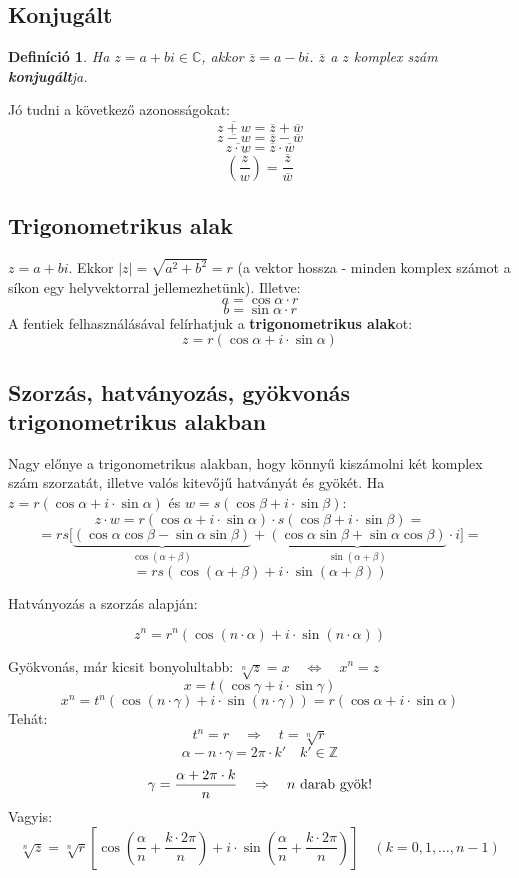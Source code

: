 \documentclass[a4paper,12pt,twoside]{book}
\newtheorem{defi}{Definíció}[chapter]
\theoremstyle{break}
\begin{document}
\subsection{Konjugált}

\begin{defi}
 Ha $z = a+bi \in\mathbb{C}$, akkor $\overline{z} = a-bi$. $\overline{z}$ a $z$ komplex szám \textbf{konjugált}ja.
\end{defi}

Jó tudni a következő azonosságokat:
\[\overline{z+w} = \overline{z}+\overline{w}\]
\[\overline{z-w} = \overline{z}-\overline{w}\]
\[\overline{z\cdot w} = \overline{z} \cdot \overline{w}\]
\[\overline{\left(\frac{z}{w}\right)} = \frac{\overline{z}}{\overline{w}}\]

\subsection{Trigonometrikus alak}

$z = a+bi$. Ekkor $|z| = \sqrt{a^2+b^2} = r$ (a vektor hossza - minden komplex számot a síkon egy helyvektorral jellemezhetünk). Illetve:
\[a = \cos\alpha\cdot r\]
\[b = \sin\alpha\cdot r\]
A fentiek felhasználásával felírhatjuk a \textbf{trigonometrikus alak}ot:
\[\boxed{z = r(\cos \alpha + i\cdot \sin\alpha)}\]

\subsection{Szorzás, hatványozás, gyökvonás trigonometrikus alakban}

Nagy előnye a trigonometrikus alakban, hogy könnyű kiszámolni két komplex szám szorzatát, illetve valós kitevőjű hatványát és gyökét. Ha $z=r(\cos \alpha + i\cdot \sin\alpha)$ és $w=s(\cos \beta + i\cdot \sin\beta)$:
\[z\cdot w = r(\cos \alpha + i\cdot \sin\alpha)\cdot s(\cos \beta + i\cdot \sin\beta) = \]
\[ = rs\Big[\underbrace{(\cos\alpha\cos\beta-\sin\alpha\sin\beta)}_{\cos(\alpha+\beta)}+\underbrace{(\cos\alpha\sin\beta+\sin\alpha\cos\beta)}_{\sin(\alpha+\beta)}\cdot i\Big] = \]
\[ = \boxed{rs(\cos(\alpha+\beta)+i\cdot \sin(\alpha+\beta))}\]

Hatványozás a szorzás alapján:

\[\boxed{z^n = r^n(\cos (n\cdot\alpha)+i\cdot \sin (n\cdot\alpha))}\]

Gyökvonás, már kicsit bonyolultabb: $\sqrt[n]{z} = x \quad \Leftrightarrow \quad x^n = z$
\[x = t(\cos\gamma+i\cdot\sin\gamma)\]
\[x^n = t^n(\cos (n\cdot\gamma)+i\cdot\sin(n\cdot \gamma)) = r(\cos \alpha+i\cdot \sin\alpha)\]
Tehát:
\[t^n = r \quad \Rightarrow \quad t = \sqrt[n]{r}\]
\[\alpha - n\cdot \gamma = 2\pi\cdot k' \quad k' \in \mathbb{Z}\]
\[\gamma = \frac{\alpha + 2\pi\cdot k}{n} \quad \Rightarrow \quad \hbox{$n$ darab gyök!}\]
Vagyis:
\[\boxed{\sqrt[n]{z} = \sqrt[n]{r}\left[\cos\left(\frac{\alpha}{n}+\frac{k\cdot 2\pi}{n}\right)+i\cdot \sin\left(\frac{\alpha}{n}+\frac{k\cdot 2\pi}{n}\right)\right]} \quad (k = 0, 1, \ldots, n-1)\]
\end{document}
